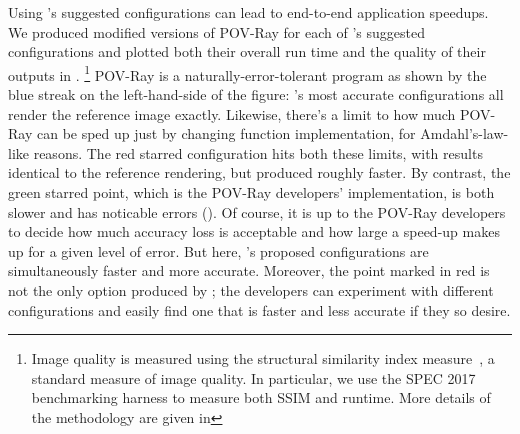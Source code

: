 \documentclass[paper.tex]{subfiles}
\begin{document}
Using \name's suggested configurations
  can lead to end-to-end application speedups.
We produced modified versions of POV-Ray
  for each of \name's suggested configurations
  and plotted both their overall run time
  and the quality of their outputs in .%
\footnote{
  Image quality is measured using
  the structural similarity index measure~\cite{ssim},
  a standard measure of image quality.
  In particular, we use the SPEC 2017 benchmarking harness
  to measure both SSIM and runtime.
  More details of the methodology are given
  in 
}
POV-Ray is a naturally-error-tolerant program
  as shown by the blue streak on the left-hand-side of the figure:
  \name's \nPovRaySatConfigs most accurate configurations
  all render the reference image exactly.
Likewise, there's a limit to how much POV-Ray can be sped up
  just by changing function implementation,
  for Amdahl's-law-like reasons.
The red starred configuration hits both these limits,
  with results identical to the reference rendering,
  but produced roughly \nPovRayLosslessSpeedup faster.
By contrast, the green starred point,
  which is the POV-Ray developers' implementation,
  is both slower and has noticable errors
  ().
Of course, it is up to the POV-Ray developers to decide
  how much accuracy loss is acceptable
  and how large a speed-up makes up for a given level of error.
But here, \name's proposed configurations
  are simultaneously faster and more accurate.
Moreover, the point marked in red is not the only option
  produced by \name;
  the developers can experiment with different configurations
  and easily find one that is faster and less accurate
  if they so desire.
\end{document}
